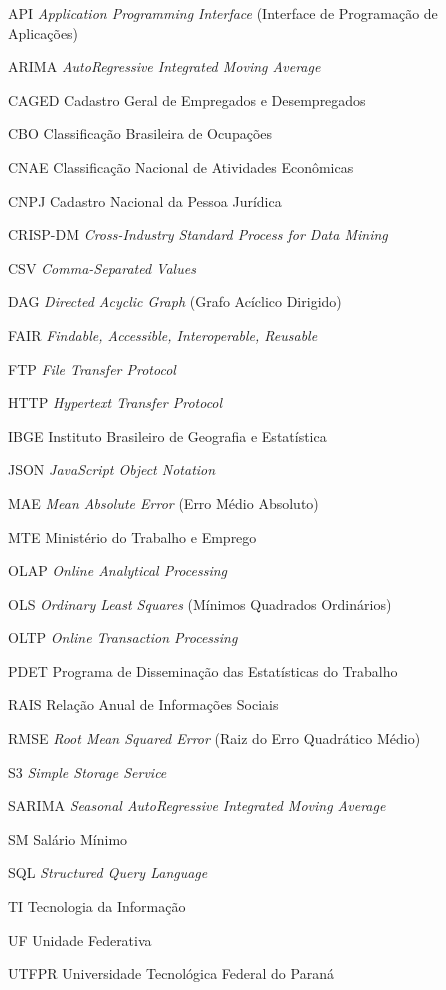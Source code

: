 
\begin{siglas}
    \item[API] \textit{Application Programming Interface} (Interface de Programação de Aplicações)
    \item[ARIMA] \textit{AutoRegressive Integrated Moving Average}
    \item[CAGED] Cadastro Geral de Empregados e Desempregados
    \item[CBO] Classificação Brasileira de Ocupações
    \item[CNAE] Classificação Nacional de Atividades Econômicas
    \item[CNPJ] Cadastro Nacional da Pessoa Jurídica
    \item[CRISP-DM] \textit{Cross-Industry Standard Process for Data Mining}
    \item[CSV] \textit{Comma-Separated Values}
    \item[DAG] \textit{Directed Acyclic Graph} (Grafo Acíclico Dirigido)
    \item[FAIR] \textit{Findable, Accessible, Interoperable, Reusable}
    \item[FTP] \textit{File Transfer Protocol}
    \item[HTTP] \textit{Hypertext Transfer Protocol}
    \item[IBGE] Instituto Brasileiro de Geografia e Estatística
    \item[JSON] \textit{JavaScript Object Notation}
    \item[MAE] \textit{Mean Absolute Error} (Erro Médio Absoluto)
    \item[MTE] Ministério do Trabalho e Emprego
    \item[OLAP] \textit{Online Analytical Processing}
    \item[OLS] \textit{Ordinary Least Squares} (Mínimos Quadrados Ordinários)
    \item[OLTP] \textit{Online Transaction Processing}
    \item[PDET] Programa de Disseminação das Estatísticas do Trabalho
    \item[RAIS] Relação Anual de Informações Sociais
    \item[RMSE] \textit{Root Mean Squared Error} (Raiz do Erro Quadrático Médio)
    \item[S3] \textit{Simple Storage Service}
    \item[SARIMA] \textit{Seasonal AutoRegressive Integrated Moving Average}
    \item[SM] Salário Mínimo
    \item[SQL] \textit{Structured Query Language}
    \item[TI] Tecnologia da Informação
    \item[UF] Unidade Federativa
    \item[UTFPR] Universidade Tecnológica Federal do Paraná
\end{siglas}
